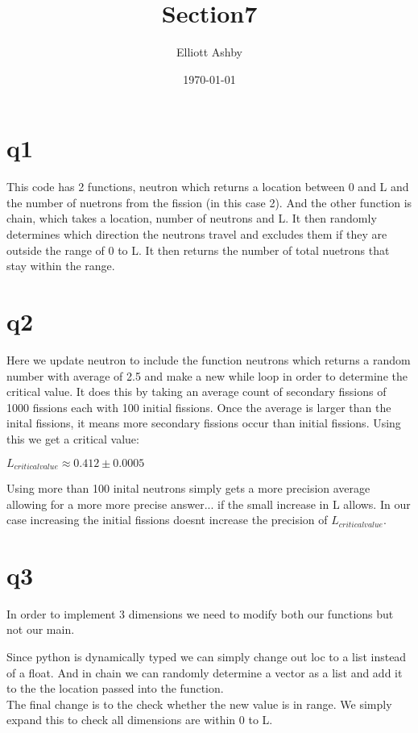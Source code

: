 \documentclass[a4paper,english]{article}
\title{Section7}
\author{Elliott Ashby}
\date{\today}
\begin{document}
    \maketitle
    \section{q1}
    
    This code has 2 functions, neutron which returns a location between 0 and L and the number of nuetrons from the fission
    (in this case 2). And the other function is chain, which takes a location, number of neutrons and L. It then randomly 
    determines which direction the neutrons travel and excludes them if they are outside the range of 0 to L. It then
    returns the number of total nuetrons that stay within the range.
    \\
    \section{q2}
    
    
    Here we update neutron to include the function neutrons which returns a random number with average of 2.5 and make 
    a new while loop in order to determine the critical value. It does this by taking an average count of secondary fissions
    of 1000 fissions each with 100 initial fissions. Once the average is larger than the inital fissions, it means more 
    secondary fissions occur than initial fissions.
    Using this we get a critical value:
    \begin{center}
        $L_{critical value} \approx 0.412 \pm 0.0005$
    \end{center}
    Using more than 100 inital neutrons simply gets a more precision average allowing for a more more precise answer...
    if the small increase in L allows. In our case increasing the initial fissions doesnt increase the precision of
    $L_{critical value}$.
    \section{q3}
    In order to implement 3 dimensions we need to modify both our functions but not our main.
    
    Since python is dynamically typed we can simply change out loc to a list instead of a float. And in chain we can
    randomly determine a vector as a list and add it to the the location passed into the function.
    \\
    The final change is to the check whether the new value is in range. We simply expand this to check all dimensions are
    within 0 to L.
\end{document}
